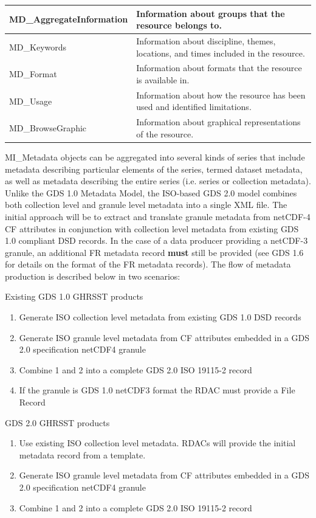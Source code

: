 \begin{longtable}{|p{}|p{}|}
    \rowcolor{lightgray}MD\_AggregateInformation & Information about groups that the resource belongs to.\\ \hline
    \rowcolor{lightgray}MD\_Keywords & Information about discipline, themes, locations, and times included in the resource. \\ \hline
    \rowcolor{lightgray} MD\_Format & Information about formats that the resource is available in. \\ \hline
    MD\_Usage & Information about how the resource has been used and identified limitations. \\ \hline
    MD\_BrowseGraphic  & Information about graphical representations of the resource. \\ 
\end{longtable}

MI\_Metadata objects can be aggregated into several kinds of series that include metadata describing
particular elements of the series, termed dataset metadata, as well as metadata describing the entire
series (i.e. series or collection metadata). Unlike the GDS 1.0 Metadata Model, the ISO-based GDS
2.0 model combines both collection level and granule level metadata into a single XML file. The initial
approach will be to extract and translate granule metadata from netCDF-4 CF attributes in conjunction
with collection level metadata from existing GDS 1.0 compliant DSD records. In the case of a data
producer providing a netCDF-3 granule, an additional FR metadata record \textbf{must} still be provided (see
GDS 1.6 for details on the format of the FR metadata records). The flow of metadata production is
described below in two scenarios:
\newp

Existing GDS 1.0 GHRSST products
\begin{enumerate}[noitemsep]
    \item Generate ISO collection level metadata from existing GDS 1.0 DSD records
    \item Generate ISO granule level metadata from CF attributes embedded in a GDS 2.0 specification netCDF4 granule
    \item Combine 1 and 2 into a complete GDS 2.0 ISO 19115-2 record
    \item If the granule is GDS 1.0 netCDF3 format the RDAC must provide a File Record 
\end{enumerate}
\newp

GDS 2.0 GHRSST products
\begin{enumerate}[noitemsep]
    \item Use existing ISO collection level metadata. RDACs will provide the initial metadata record from a template.
    \item Generate ISO granule level metadata from CF attributes embedded in a GDS 2.0 specification netCDF4 granule
    \item Combine 1 and 2 into a complete GDS 2.0 ISO 19115-2 record 
\end{enumerate}
\newp

